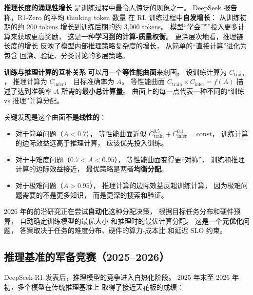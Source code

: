 \textbf{推理长度的涌现性增长}
是训练过程中最令人惊讶的现象之一。
DeepSeek 报告称，R1-Zero 的平均 thinking token 数量
在 RL 训练过程中\textbf{自发增长}：
从训练初期的约 200 tokens
增长到训练后期的约 3,000 tokens。
模型“学会了”投入更多计算来获取更高奖励，
这是一种\textbf{学习到的计算-质量权衡}。
更深层次地看，推理链长度的增长
反映了模型内部推理策略复杂度的增长，
从简单的“直接计算”进化为包含
回溯、验证、分类讨论的多层策略。

\textbf{训练与推理计算的互补关系}
可以用一个\textbf{等性能曲面}来刻画。
设训练计算为 $C_{\text{train}}$，
推理计算为 $C_{\text{infer}}$，
目标准确率为 $A$。
等性能曲面 $C_{\text{train}} \times C_{\text{infer}} = f(A)$
描述了达到准确率 $A$ 所需的\textbf{最小总计算量}。
曲面上的每一点代表一种不同的“训练 vs 推理”计算分配。

关键发现是这个曲面\textbf{不是线性的}：
\begin{itemize}[noitemsep]
  \item 对于简单问题（$A < 0.7$），
        等性能曲面近似 $C_{\text{train}}^{0.5} + C_{\text{infer}}^{0.1} = \text{const}$，
        训练计算的边际效益远高于推理计算，
        应该优先投入训练。
  \item 对于中难度问题（$0.7 < A < 0.95$），
        等性能曲面变得更“对称”，
        训练和推理计算的边际效益接近，
        最优策略是两者\textbf{均衡分配}。
  \item 对于极难问题（$A > 0.95$），
        推理计算的边际效益反超训练计算，
        因为极难问题需要的不是更多知识，
        而是更深的搜索和验证。
\end{itemize}

2026 年的前沿研究正在尝试\textbf{自动化}这种分配决策，
根据目标任务分布和硬件预算，
自动确定训练模型的最优大小
和推理时的最优计算分配。
这是一个\textbf{元优化}问题，
答案取决于任务的难度分布、硬件的算力-成本比
和延迟 SLO 约束。

\subsection{推理基准的军备竞赛（2025--2026）}

DeepSeek-R1 发表后，推理模型的竞争进入白热化阶段。
2025 年末至 2026 年初，多个模型在传统推理基准上
取得了接近天花板的成绩：


